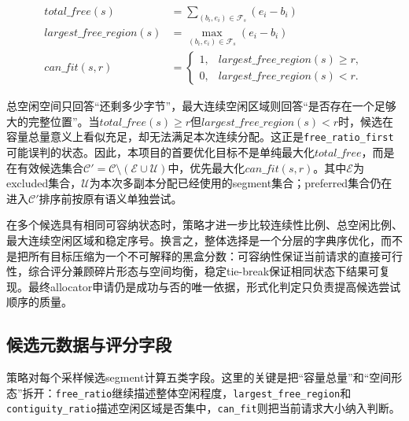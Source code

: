 \documentclass[UTF8,zihao=-4,a4paper]{ctexart}
\newcommand{\artifact}[1]{\texttt{#1}}
\newcommand{\baseline}{\texttt{free\_ratio\_first}}
\newcommand{\mvar}[1]{\mathit{#1}}
\begin{document}
\begin{align}
  \mvar{total\_free}(s)
    &= \sum_{(b_i,e_i)\in\mathcal{F}_s}(e_i-b_i) \\
  \mvar{largest\_free\_region}(s)
    &= \max_{(b_i,e_i)\in\mathcal{F}_s}(e_i-b_i) \\
  \mvar{can\_fit}(s,r)
    &=
    \begin{cases}
      1, & \mvar{largest\_free\_region}(s)\ge r, \\
      0, & \mvar{largest\_free\_region}(s)<r.
    \end{cases}
\end{align}

总空闲空间只回答“还剩多少字节”，最大连续空闲区域则回答“是否存在一个足够大的完整位置”。当\(\mvar{total\_free}(s)\ge r\)但\(\mvar{largest\_free\_region}(s)<r\)时，候选在容量总量意义上看似充足，却无法满足本次连续分配。这正是\baseline{}可能误判的状态。因此，本项目的首要优化目标不是单纯最大化\(\mvar{total\_free}\)，而是在有效候选集合\(\mathcal{C}'=\mathcal{C}\setminus(\mathcal{E}\cup\mathcal{U})\)中，优先最大化\(\mvar{can\_fit}(s,r)\)。其中\(\mathcal{E}\)为excluded集合，\(\mathcal{U}\)为本次多副本分配已经使用的segment集合；preferred集合仍在进入\(\mathcal{C}'\)排序前按原有语义单独尝试。

在多个候选具有相同可容纳状态时，策略才进一步比较连续性比例、总空闲比例、最大连续空闲区域和稳定序号。换言之，整体选择是一个分层的字典序优化，而不是把所有目标压缩为一个不可解释的黑盒分数：可容纳性保证当前请求的直接可行性，综合评分兼顾碎片形态与空间均衡，稳定tie-break保证相同状态下结果可复现。最终allocator申请仍是成功与否的唯一依据，形式化判定只负责提高候选尝试顺序的质量。

\subsection{候选元数据与评分字段}

策略对每个采样候选segment计算五类字段。这里的关键是把“容量总量”和“空间形态”拆开：\artifact{free\_ratio}继续描述整体空闲程度，\artifact{largest\_free\_region}和\artifact{contiguity\_ratio}描述空闲区域是否集中，\artifact{can\_fit}则把当前请求大小纳入判断。
\end{document}
